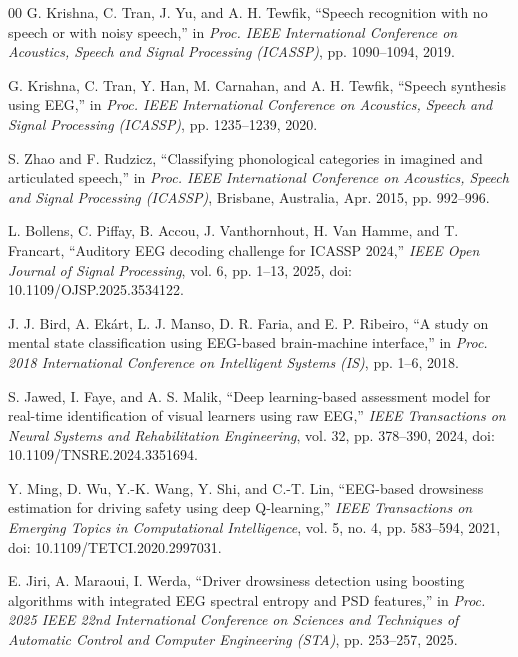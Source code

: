 \begin{thebibliography}{00}
G. Krishna, C. Tran, J. Yu, and A. H. Tewfik, ``Speech recognition with no speech
or with noisy speech,'' in \textit{Proc. IEEE International Conference on Acoustics,
Speech and Signal Processing (ICASSP)}, pp. 1090--1094, 2019.

G. Krishna, C. Tran, Y. Han, M. Carnahan, and A. H. Tewfik, ``Speech synthesis
using EEG,'' in \textit{Proc. IEEE International Conference on Acoustics, Speech
and Signal Processing (ICASSP)}, pp. 1235--1239, 2020.

S. Zhao and F. Rudzicz, ``Classifying phonological categories in imagined and
articulated speech,'' in \textit{Proc. IEEE International Conference on Acoustics,
Speech and Signal Processing (ICASSP)}, Brisbane, Australia, Apr. 2015,
pp. 992--996.

L. Bollens, C. Piffay, B. Accou, J. Vanthornhout, H. Van Hamme, and T. Francart,
``Auditory EEG decoding challenge for ICASSP 2024,'' \textit{IEEE Open Journal
of Signal Processing}, vol. 6, pp. 1--13, 2025,
doi: 10.1109/OJSP.2025.3534122.

J. J. Bird, A. Ek\'{a}rt, L. J. Manso, D. R. Faria, and E. P. Ribeiro, ``A study
on mental state classification using EEG-based brain-machine interface,'' in
\textit{Proc. 2018 International Conference on Intelligent Systems (IS)},
pp. 1--6, 2018.

S. Jawed, I. Faye, and A. S. Malik, ``Deep learning-based assessment model for
real-time identification of visual learners using raw EEG,'' \textit{IEEE
Transactions on Neural Systems and Rehabilitation Engineering}, vol. 32,
pp. 378--390, 2024, doi: 10.1109/TNSRE.2024.3351694.

Y. Ming, D. Wu, Y.-K. Wang, Y. Shi, and C.-T. Lin, ``EEG-based drowsiness
estimation for driving safety using deep Q-learning,'' \textit{IEEE Transactions
on Emerging Topics in Computational Intelligence}, vol. 5, no. 4, pp. 583--594,
2021, doi: 10.1109/TETCI.2020.2997031.

E. Jiri, A. Maraoui, I. Werda, ``Driver drowsiness detection using boosting
algorithms with integrated EEG spectral entropy and PSD features,'' in
\textit{Proc. 2025 IEEE 22nd International Conference on Sciences and Techniques
of Automatic Control and Computer Engineering (STA)}, pp. 253--257, 2025.



\end{thebibliography}

